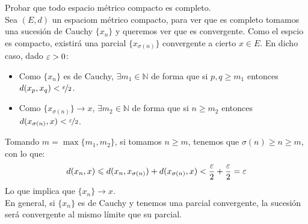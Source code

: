     \begin{ejercicio}
    Probar que todo espacio métrico compacto es completo.\\

    \noindent
    Sea $(E,d)$ un espaciom métrico compacto, para ver que es completo tomamos una sucesión de Cauchy $\{x_n\}$ y queremos ver que es convergente. Como el espcio es compacto, existirá una parcial $\{x_{\sigma(n)}\}$ convergente a cierto $x\in E$. En dicho caso, dado $\varepsilon > 0$:
    \begin{itemize}
        \item Como $\{x_n\}$ es de Cauchy, $\exists m_1\in \mathbb{N}$ de forma que si $p,q \geq m_1$ entonces $d(x_p,x_q)<\nicefrac{\varepsilon}{2}$.
        \item Como $\{x_{\sigma(n)}\}\to x$, $\exists m_2 \in \mathbb{N}$ de forma que si $n\geq m_2$ entonces $d(x_{\sigma(n)},x) < \nicefrac{\varepsilon}{2}$.
    \end{itemize}
    Tomando $m = \max \{m_1,m_2\}$, si tomamos $n\geq m$, tenemos que $\sigma(n)\geq n \geq m$, con lo que:
    \begin{equation*}
        d(x_n,x) \leqslant d(x_n,x_{\sigma(n)}) + d(x_{\sigma(n)}, x) < \dfrac{\varepsilon}{2}+ \dfrac{\varepsilon}{2} = \varepsilon
    \end{equation*}
    Lo que implica que $\{x_n\} \to x$.\\

    \noindent
    En general, si $\{x_n\}$ es de Cauchy y tenemos una parcial convergente, la sucesión será convergente al mismo límite que su parcial.
    \end{ejercicio}
    
